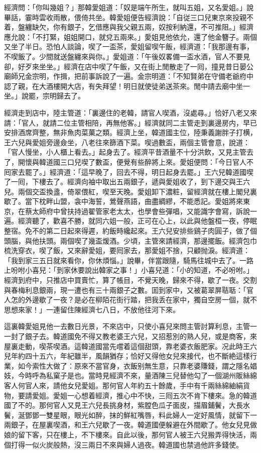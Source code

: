 經濟問：「你叫幾姐？」那韓愛姐道：「奴是端午所生，就叫五姐，又名愛姐。」說畢話，霎時雲收雨散，偎倚共坐。韓愛姐便告經濟說：「自従三口兒東京來投親不着，盤纏缺欠，你有銀子，乞借應與我父親五兩，奴按利納還，不可推阻。」經濟應允說：「不打緊，姐姐開口，就兌五兩來。」愛姐見他依允，還了他金簪子。兩個又坐了半日。恐怕人談論，喫了一盃茶，愛姐留喫午飯，經濟道：「我那邊有事，不喫飯了。少間就送盤纏來與你。」愛姐道：「午後奴畧備一盃水酒，官人不要見卻，好歹來坐坐。」經濟在店中喫了午飯，又在街上閒散走了一囘，撞見昔日晏公廟師兄金宗明，作揖，把前事訴說了一遍。金宗明道：「不知賢弟在守備老爺府中認了親，在大酒樓開大店，有失拜望！明日就使徒弟送茶來。閒中請去廟中坐一坐。」說罷，宗明歸去了。

經濟走到店中，陸主管道：「裏邊住的老韓，請官人喫酒，沒處尋。」恰好八老又來請：「官人，就請二位主管相陪，再無他客。」經濟就同二主管走到裏邊房内，早已安排酒席齊整，無非魚肉菜菓之類。經濟上坐，韓道國主位，陸秉義謝胖子打横，王六兒與愛姐旁邊僉坐，八老往來篩酒下菜。喫過數盃，兩個主管會意，說道：「官人慢坐，小人櫃上看去。」起身去了。經濟平昔酒量不十分洪飲，又見主管去了，開懷與韓道國三口兒喫了數盃，便覺有些醉將上來。愛姐便問：「今日官人不囘家去罷了。」經濟道：「這早晚了，回去不得，明日起身去罷。」王六兒韓道國喫了一囘，下樓去了。經濟向袖中取出五兩銀子，遞與愛姐收了，到下邊交與王六兒。兩個交盃換盞，倚翠偎紅，喫至天晚。愛姐卸下濃粧，留經濟就在樓上閣兒裏歇了。當下枕畔山盟，衾中海誓，鶯聲燕語，曲盡綢繆，不能悉記。愛姐將來東京，在蔡太師府中曾扶持過翟管家老太太，也學會些彈唱，又能識字會寫，訴說一遍。經濟聽了，歡喜不勝，就同六姐一般，正可在心上，以此與他盤桓一夜，停眠整宿。免不的第二日起來得遲，約飯時纔起來。王六兒安排些鷄子肉圓子，做了個頭腦，與他扶頭。兩個喫了幾盃煖酒。少頃，主管來請經濟，那邊擺飯。經濟包巾梳洗穿衣，喫了飯，又來辭愛姐，要囘家去，那愛姐不捨，只顧抛淚。經濟道：「我到家三五日就來看你，你休煩惱。」說畢，伴當跟隨，騎馬往城中去了。一路上吩咐小喜兒：「到家休要說出韓家之事！」小喜兒道：「小的知道，不必吩咐。」經濟到府中，只推店中買賣忙，算了帳目，不覺天晚，歸來不得，歇了一夜。交割與春梅利息銀兩，現一遭也有三十兩銀子之數。囬到家中，又被葛翠屏聐聒：「官人怎的外邊歇了一夜？是必在柳陌花街行踏，把我丢在家中，獨自空房一個，就不思想來家！」一連留住陳經濟七八日，不放他往河下來。

這裏韓愛姐見他一去數日光景，不來店中，只使小喜兒來問主管討算利息，主管一一封了銀子去。韓道國免不得又教老婆王六兒，又招惹別的熟人兒，或是商客，來屋裏走動，喫茶喫酒。這韓道國當先嚐着這個甜頭，靠老婆衣飯肥家。况此時王六兒年約四十五六，年紀雖半，風韻猶存；恰好又得他女兒來接代，也不斷絶這樣行業，如今索性大做了：原來不當官身，衣飯别無生意，只靠老婆賺錢，謂之隱名娼妓，今時呼為私窠子是也。當時見經濟不來，量酒陳三兒替他勾了一個湖州販絲綿客人何官人來，請他女兒愛姐。那何官人年約五十餘歲，手中有千兩絲綿紬絹貨物，要請愛姐。愛姐一心想着經濟，推心中不快，三囘五次不肯下樓來。急的韓道國了不的。那何官人又見王六兒長挑身材，紫膛色瓜子面皮，描眉鋪鬢，大長水鬢，涎鄧鄧一雙星眼，眼光如醉，抹的鮮紅嘴唇，料此婦人一定好風情，就留下一兩銀子，在屋裏喫酒，和王六兒歇了一夜。韓道國便躲避在外間歇了。他女兒見做娘的留下客，只在樓上，不下樓來。自此以後，那何官人被王六兒搬弄得快活，兩個打得一似火炭般熱，沒三兩日不來與婦人過夜。韓道國也禁過他許多錢使。

